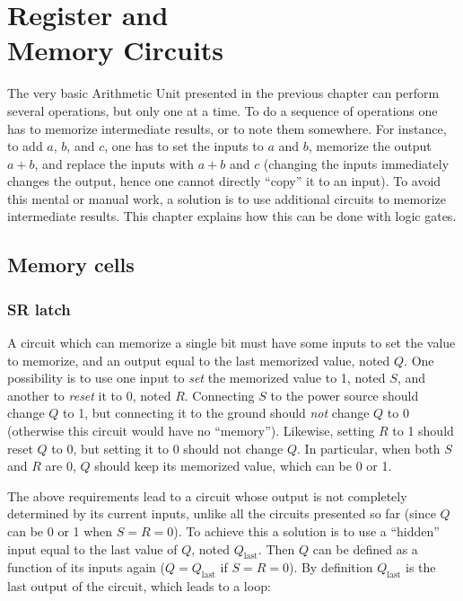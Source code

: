 
\chapter[Register and Memory Circuits]{Register and\\ Memory
Circuits}\label{chapter:memory-circuits}

The very basic Arithmetic Unit presented in the previous chapter can perform
several operations, but only one at a time. To do a sequence of operations one
has to memorize intermediate results, or to note them somewhere. For instance,
to add $a$, $b$, and $c$, one has to set the inputs to $a$ and $b$, memorize
the output $a+b$, and replace the inputs with $a+b$ and $c$ (changing the
inputs immediately changes the output, hence one cannot directly ``copy'' it to
an input). To avoid this mental or manual work, a solution is to use additional
circuits to memorize intermediate results. This chapter explains how this can
be done with logic gates.

\section{Memory cells}

\subsection{SR latch}

A circuit which can memorize a single bit must have some inputs to set the
value to memorize, and an output equal to the last memorized value, noted $Q$.
One possibility is to use one input to {\em set} the memorized value to 1,
noted $S$, and another to {\em reset} it to 0, noted $R$. Connecting $S$ to the
power source should change $Q$ to 1, but connecting it to the ground should
{\em not} change $Q$ to 0 (otherwise this circuit would have no ``memory'').
Likewise, setting $R$ to 1 should reset $Q$ to 0, but setting it to 0 should
not change $Q$. In particular, when both $S$ and $R$ are 0, $Q$ should keep its
memorized value, which can be 0 or 1.

The above requirements lead to a circuit whose output is not completely
determined by its current inputs, unlike all the circuits presented so far
(since $Q$ can be 0 or 1 when $S=R=0$). To achieve this a solution is to use a
``hidden'' input equal to the last value of $Q$, noted $Q_\mathrm{last}$. Then
$Q$ can be defined as a function of its inputs again ($Q=Q_\mathrm{last}$ if
$S=R=0$). By definition $Q_\mathrm{last}$ is the last output of the circuit,
which leads to a loop:


